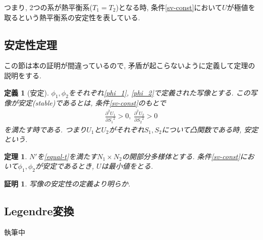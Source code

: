 \documentclass[a4paper,12pt]{ltjsarticle}
\theoremstyle{break}
\newtheorem{defn}[thm]{定義}
\newtheorem{thrm}[thm]{定理}
\newtheorem*{prf}{証明}
\newcommand{\ti}{\times}
\newcommand{\ddddel}[2]{\frac{\partial^2{#1}}{\partial{#2}^2}}
\numberwithin{equation}{section}
\begin{document}
つまり, 2つの系が熱平衡系($T_1=T_2$)となる時, 条件\eqref{sv-const}において$U$が極値を取るという熱平衡系の安定性を表している. 


\subsection{安定性定理}

この節は本の証明が間違っているので, 矛盾が起こらないように定義して定理の説明をする. 

\begin{defn}[安定]
  $\phi_1,\phi_2$をそれぞれ\eqref{phi_1}, \eqref{phi_2}で定義された写像とする. 
  この写像が安定(stable)であるとは, 条件\eqref{sv-const}のもとで
  \begin{align}
    \label{stable}
    \ddddel{U_1}{S_1} > 0, ~\ddddel{U_2}{S_2} > 0
  \end{align}
  を満たす時である. つまり$U_1$と$U_2$がそれぞれ$S_1,S_2$について凸関数である時, 安定という. 
\end{defn}

\begin{thrm}
  $N'$を\eqref{equal-t}を満たす$N_1 \ti N_2$の開部分多様体とする. 
  条件\eqref{sv-const}において$\phi_1,\phi_2$が安定であるとき, $U$は最小値をとる.
\end{thrm}

\begin{prf}
  写像の安定性の定義より明らか. 
\end{prf}

\subsection{Legendre変換}

執筆中
\end{document}
